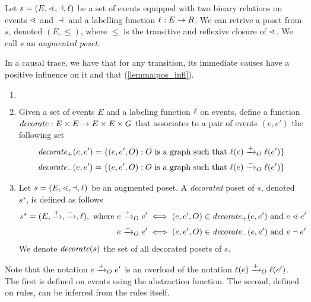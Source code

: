 \begin{definition}
  Let $s=(E,\lessdot,\dashv,\ell)$ be a set of events equipped with two binary relations on events $\lessdot$ and $\dashv$ and a labelling function $\ell:E\to R$. We can retrive a poset from $s$, denoted $(E,\leq)$, where $\leq$ is the transitive and reflexive closure of $\lessdot$.
  We call $s$ an \emph{augmented poset}.
\end{definition}

In a causal trace, we have that for any transition, its immediate causes have a positive influence on it and that (\autoref{lemma:pos_infl}).

\begin{definition}
  \begin{enumerate}
  \item[] $~$
  \item Given a set of events $E$ and a labeling function $\ell$ on events, define a function $\mathit{decorate}:E\times E \to E\times E\times G$ that associates to a pair of events $(e,e')$ the following set
    \begin{align*}
      \mathit{decorate}_{+}(e,e') = \{(e,e',O) : O\text{ is a graph such that }\ell(e)\mathrel{\xrightarrow{+}}_O \ell(e')\}\\
       \mathit{decorate}_{-}(e,e') = \{(e,e',O) : O\text{ is a graph such that }\ell(e)\mathrel{\xrightarrow{-}}_O \ell(e')\}
    \end{align*}

  \item Let $s = (E,\lessdot,\dashv,\ell)$ be an augmented poset. A \emph{decorated} poset of $s$, denoted $s^{\star}$, is defined as follows
    \begin{align*}
      s^{\star} = (E,\mathrel{\xrightarrow{+}},\mathrel{\xrightarrow{-}},\ell), \text{ where }
      &e\mathrel{\xrightarrow{+}}_O e' \iff (e,e',O)\in\mathit{decorate}_+(e,e')\text{ and }e\lessdot e'\\
      &e\mathrel{\xrightarrow{-}}_O e' \iff (e,e',O)\in\mathit{decorate}_-(e,e')\text{ and }e\dashv e'\\
    \end{align*}
    We denote $\mathit{decorate}(s)$ the set of all decorated posets of $s$.
  \end{enumerate}
\end{definition}

Note that the notation $e\mathrel{\xrightarrow{+}}_O e'$ is an overload of the notation $\ell(e)\mathrel{\xrightarrow{+}}_O \ell(e')$. The first is defined on events using the abstraction function. The second, defined on rules, can be inferred from the rules itself.

